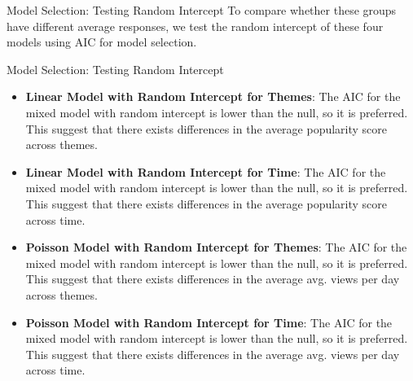 
\begin{frame}{Model Selection: Testing Random Intercept}
To compare whether these groups have different average responses, we test the random intercept of these four models using AIC for model selection.
    
\end{frame}

\begin{frame}{Model Selection: Testing Random Intercept}
\begin{itemize}
	\item \textbf{Linear Model with Random Intercept for Themes}: The AIC for the mixed model with random intercept is lower than the null, so it is preferred. This suggest that there exists differences in the average popularity score across themes.
	\item \textbf{Linear Model with Random Intercept for Time}: The AIC for the mixed model with random intercept is lower than the null, so it is preferred. This suggest that there exists differences in the average popularity score across time.
	\item \textbf{Poisson Model with Random Intercept for Themes}: The AIC for the mixed model with random intercept is lower than the null, so it is preferred. This suggest that there exists differences in the average avg. views per day across themes.
	\item \textbf{Poisson Model with Random Intercept for Time}: The AIC for the mixed model with random intercept is lower than the null, so it is preferred. This suggest that there exists differences in the average avg. views per day across time.
\end{itemize}
 
\end{frame}

